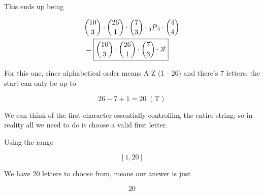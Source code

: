 \documentclass[../Main.tex]{subfiles}
\begin{document}
\begin{alphabet}
{        This ends up being

        \begin{align*}
            & {10 \choose 3} \cdot {26 \choose 1} \cdot {7 \choose 3} \cdot \prescript{}{3}{P}_3 \cdot {4 \choose 4} \\
            &= \boxed{{10 \choose 3} \cdot {26 \choose 1} \cdot {7 \choose 3} \cdot 3!} \\
        \end{align*}
    }

    \item
    {
        For this one, since alphabetical order means A-Z (1 - 26) and there's 7 letters, the start can only be up to
        
        $$26 - 7 + 1 = 20 \; (\text{T})$$

        We can think of the first character essentially controlling the entire string, so in reality all we need to do is choose
        a valid first letter.

        Using the range

        $$\left[1, 20 \right]$$

        We have 20 letters to choose from, means our answer is just

        $$\boxed{20}$$
    }

\end{alphabet}

\end{document}
